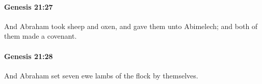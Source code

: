 		\paragraph{Genesis 21:27} %
			\label{GENESIS-21-27}

			And Abraham took sheep and oxen, and gave them unto Abimelech; and both of them made a covenant.


		\paragraph{Genesis 21:28} %
			\label{GENESIS-21-28}

			And Abraham set seven ewe lambs of the flock by themselves.


